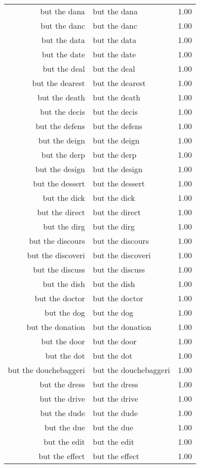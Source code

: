 \begin{table}[ht]
\begin{tabular}{rlr}
  but the dana & but the dana & 1.00 \\ 
  but the danc & but the danc & 1.00 \\ 
  but the data & but the data & 1.00 \\ 
  but the date & but the date & 1.00 \\ 
  but the deal & but the deal & 1.00 \\ 
  but the dearest & but the dearest & 1.00 \\ 
  but the death & but the death & 1.00 \\ 
  but the decis & but the decis & 1.00 \\ 
  but the defens & but the defens & 1.00 \\ 
  but the deign & but the deign & 1.00 \\ 
  but the derp & but the derp & 1.00 \\ 
  but the design & but the design & 1.00 \\ 
  but the dessert & but the dessert & 1.00 \\ 
  but the dick & but the dick & 1.00 \\ 
  but the direct & but the direct & 1.00 \\ 
  but the dirg & but the dirg & 1.00 \\ 
  but the discours & but the discours & 1.00 \\ 
  but the discoveri & but the discoveri & 1.00 \\ 
  but the discuss & but the discuss & 1.00 \\ 
  but the dish & but the dish & 1.00 \\ 
  but the doctor & but the doctor & 1.00 \\ 
  but the dog & but the dog & 1.00 \\ 
  but the donation & but the donation & 1.00 \\ 
  but the door & but the door & 1.00 \\ 
  but the dot & but the dot & 1.00 \\ 
  but the douchebaggeri & but the douchebaggeri & 1.00 \\ 
  but the dress & but the dress & 1.00 \\ 
  but the drive & but the drive & 1.00 \\ 
  but the dude & but the dude & 1.00 \\ 
  but the due & but the due & 1.00 \\ 
  but the edit & but the edit & 1.00 \\ 
  but the effect & but the effect & 1.00 \\ 

\end{tabular}
\end{table}
